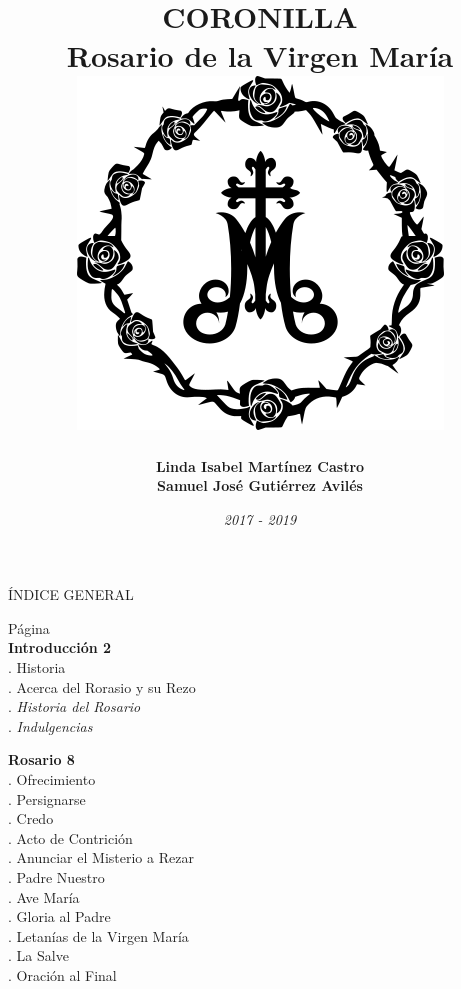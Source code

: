 \documentclass[12pt, letterpaper]{report}
\title{
  \textbf{ \Huge CORONILLA } \\
  \LARGE Rosario de la Virgen María \\
  \vspace{2em}
  \includegraphics{rosa}
}
\author{ 
  \Large \textbf{Linda Isabel Mart\'inez Castro} \\ 
  \Large \textbf{Samuel Jos\'e Guti\'errez Avil\'es}
}
\date{ \LARGE \small \textit{2017 - 2019} }
\begin{document}

    \maketitle
    
    \LARGE ÍNDICE GENERAL

    \large \hfill{Página}\\
    \Large \textbf{Introducción \hfill{2}}\\
    .\hspace{1cm} \large Historia \\
    .\hspace{1cm} \large Acerca del Rorasio y su Rezo \\
    .\hspace{2cm} \large \textit{Historia del Rosario} \\
    .\hspace{2cm} \large \textit{Indulgencias} 
    
    \noindent
    \Large \textbf{Rosario \hfill{8}}\\
    .\hspace{1cm} \large Ofrecimiento \\
    .\hspace{1cm} \large Persignarse \\
    .\hspace{1cm} \large Credo \\
    .\hspace{1cm} \large Acto de Contrición \\
    .\hspace{1cm} \large Anunciar el Misterio a Rezar \\
    .\hspace{1cm} \large Padre Nuestro \\
    .\hspace{1cm} \large Ave María \\
    .\hspace{1cm} \large Gloria al Padre \\
    .\hspace{1cm} \large Letanías de la Virgen María \\
    .\hspace{1cm} \large La Salve \\
    .\hspace{1cm} \large Oración al Final 
    \clearpage
\end{document}
